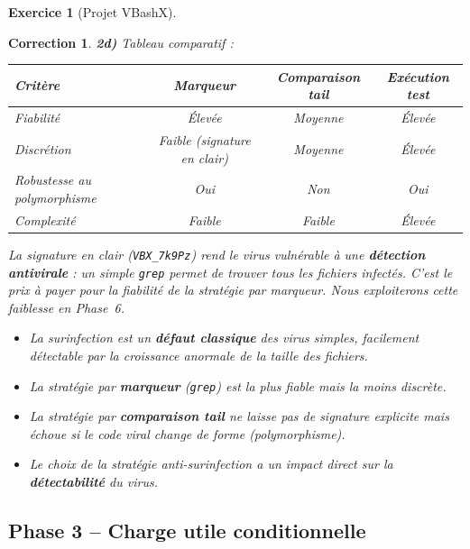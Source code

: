 \documentclass[a4paper,11pt]{article}
\theoremstyle{plain}
\newtheorem{correction}{Correction}
\theoremstyle{definition}
\newtheorem{exercice}{Exercice}
\begin{document}
\begin{exercice}[Projet VBashX]
\begin{correction}
\textbf{2d)} Tableau comparatif :
\begin{center}
\begin{tabular}{lccc}
\toprule
\textbf{Critère} & \textbf{Marqueur} & \textbf{Comparaison tail} & \textbf{Exécution test} \\
\midrule
Fiabilité & Élevée & Moyenne & Élevée \\
Discrétion & Faible (signature en clair) & Moyenne & Élevée \\
Robustesse au polymorphisme & Oui & Non & Oui \\
Complexité & Faible & Faible & Élevée \\
\bottomrule
\end{tabular}
\end{center}

\begin{attention}
La signature en clair (\texttt{VBX\_7k9Pz}) rend le virus vulnérable à une \textbf{détection antivirale} : un simple \texttt{grep} permet de trouver tous les fichiers infectés. C'est le prix à payer pour la fiabilité de la stratégie par marqueur. Nous exploiterons cette faiblesse en Phase~6.
\end{attention}

\begin{pointcle}
\begin{itemize}
    \item La surinfection est un \textbf{défaut classique} des virus simples, facilement détectable par la croissance anormale de la taille des fichiers.
    \item La stratégie par \textbf{marqueur} (\texttt{grep}) est la plus fiable mais la moins discrète.
    \item La stratégie par \textbf{comparaison tail} ne laisse pas de signature explicite mais échoue si le code viral change de forme (polymorphisme).
    \item Le choix de la stratégie anti-surinfection a un impact direct sur la \textbf{détectabilité} du virus.
\end{itemize}
\end{pointcle}

\end{correction}



\subsection*{Phase 3 -- Charge utile conditionnelle}


\end{exercice}
\end{document}
